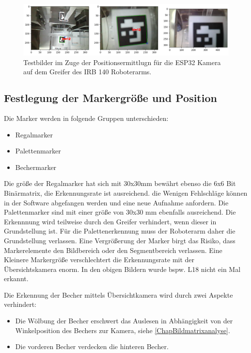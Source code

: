     \begin{figure}
        \caption[Testbilder mit ESP 32 WebCam]{Testbilder im Zuge der Positionsermittlugn für die ESP32 Kamera auf dem Greifer des IRB 140 Roboterarms.}\label{fig:figure27}
        \includegraphics[width = \textwidth]{Bilder/ESP32CamTest.png}
        \centering
    \end{figure}

    \subsection{Festlegung der Markergröße und Position}

    Die Marker werden in folgende Gruppen unterschieden:
    \begin{itemize}
        \item Regalmarker
        \item Palettenmarker
        \item Bechermarker
    \end{itemize}
    Die größe der Regalmarker hat sich mit 30x30mm bewährt ebenso die 6x6 Bit Binärmatrix, die Erkennungsrate ist ausreichend. die Wenigen Fehlschläge können in der Software abgefangen werden und eine neue Aufnahme anfordern.
    Die Palettenmarker sind mit einer größe von 30x30 mm ebenfalls ausreichend. 
    Die Erkennnung wird teilweise durch den Greifer verhindert, wenn dieser in Grundstellung ist. 
    Für die Palettenerkennung muss der Roboterarm daher die Grundstellung verlassen. 
    Eine Vergrößerung der Marker birgt das Risiko, dass Markerelemente den Bildbereich oder den Segmentbereich verlassen. 
    Eine Kleinere Markergröße verschlechtert die Erkennungsrate mit der Übersichtskamera enorm. 
    In den obigen Bildern wurde bspw. L18 nicht ein Mal erkannt.
    
    Die Erkennung der Becher mittels Übersichtkamera wird durch zwei Aspekte verhindert:
    \begin{itemize}
        \item Die Wölbung der Becher erschwert das Auslesen in Abhängigkeit von der Winkelposition des Bechers zur Kamera, siehe \ref{ChapBildmatrixanalyse}.
        \item Die vorderen Becher verdecken die hinteren Becher.
    \end{itemize}

